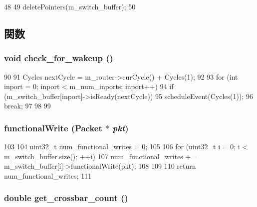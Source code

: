 \begin{DoxyCode}
48 {
49     deletePointers(m_switch_buffer);
50 }
\end{DoxyCode}


\subsection{関数}
\hypertarget{classSwitch__d_a3312235aad1a35d2eb8dfe6b3a93d880}{
\subsubsection[{check\_\-for\_\-wakeup}]{\setlength{\rightskip}{0pt plus 5cm}void check\_\-for\_\-wakeup ()}}
\label{classSwitch__d_a3312235aad1a35d2eb8dfe6b3a93d880}



\begin{DoxyCode}
90 {
91     Cycles nextCycle = m_router->curCycle() + Cycles(1);
92 
93     for (int inport = 0; inport < m_num_inports; inport++) {
94         if (m_switch_buffer[inport]->isReady(nextCycle)) {
95             scheduleEvent(Cycles(1));
96             break;
97         }
98     }
99 }
\end{DoxyCode}
\hypertarget{classSwitch__d_ad07b9def1d6f5e5f988a254c3a9d1ad9}{
\subsubsection[{functionalWrite}]{ functionalWrite ({\bf Packet} $\ast$ {\em pkt})}}
\label{classSwitch__d_ad07b9def1d6f5e5f988a254c3a9d1ad9}



\begin{DoxyCode}
103 {
104    uint32_t num_functional_writes = 0;
105 
106    for (uint32_t i = 0; i < m_switch_buffer.size(); ++i) {
107        num_functional_writes += m_switch_buffer[i]->functionalWrite(pkt);
108    }
109 
110    return num_functional_writes;
111 }
\end{DoxyCode}
\hypertarget{classSwitch__d_a7ef2e2d58897abf8e58f4bff4d3d01bc}{
\subsubsection[{get\_\-crossbar\_\-count}]{\setlength{\rightskip}{0pt plus 5cm}double get\_\-crossbar\_\-count ()}}
\label{classSwitch__d_a7ef2e2d58897abf8e58f4bff4d3d01bc}



